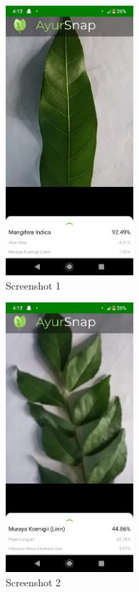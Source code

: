 \begin{figure}[H]

	\begin{subfigure}{.5\textwidth}
		\centering
		\includegraphics[width=0.7\linewidth, height=10cm]{app-screenshot-1.jpeg}
		\caption{Screenshot 1}
		\label{fig:sfig1}
	\end{subfigure}
	\begin{subfigure}{.5\textwidth}
		\centering
		\includegraphics[width=0.7\linewidth, height=10cm]{app-screenshot-2.jpeg}
		\caption{Screenshot 2}
		\label{fig:sfig2}
	\end{subfigure}
	\begin{subfigure}{.5\textwidth}
		\centering

\end{subfigure}
\end{figure}
